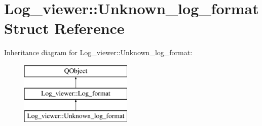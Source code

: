 \hypertarget{struct_log__viewer_1_1_unknown__log__format}{\section{Log\-\_\-viewer\-:\-:Unknown\-\_\-log\-\_\-format Struct Reference}
\label{struct_log__viewer_1_1_unknown__log__format}
}
Inheritance diagram for Log\-\_\-viewer\-:\-:Unknown\-\_\-log\-\_\-format\-:\begin{figure}[H]
\begin{center}
\leavevmode
\includegraphics[height=3.000000cm]{struct_log__viewer_1_1_unknown__log__format}
\end{center}
\end{figure}
